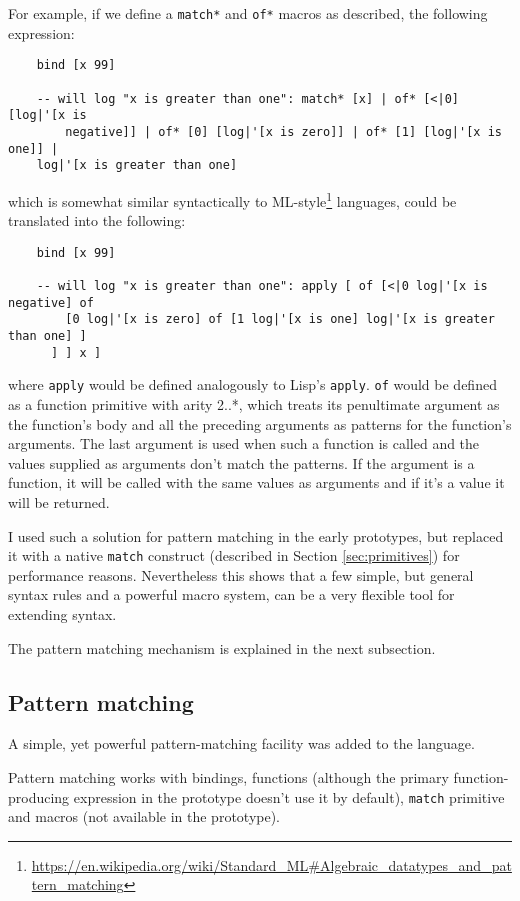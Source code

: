 For example, if we define a \texttt{match*} and \texttt{of*} macros as
described, the following expression:
\begin{lstlisting}
    bind [x 99]
    
    -- will log "x is greater than one": match* [x] | of* [<|0] [log|'[x is
        negative]] | of* [0] [log|'[x is zero]] | of* [1] [log|'[x is one]] |
    log|'[x is greater than one]
\end{lstlisting}

which is somewhat similar syntactically to
ML-style\footnote{\url{https://en.wikipedia.org/wiki/Standard_ML\#Algebraic_datatypes_and_pattern_matching}}
languages, could be translated into the following:
\begin{lstlisting}
    bind [x 99]
    
    -- will log "x is greater than one": apply [ of [<|0 log|'[x is negative] of
        [0 log|'[x is zero] of [1 log|'[x is one] log|'[x is greater than one] ]
      ] ] x ]
\end{lstlisting}

where \texttt{apply} would be defined analogously to Lisp's
\texttt{apply}. \texttt{of} would be defined as a function primitive with arity
2..*, which treats its penultimate argument as the function's body and all the
preceding arguments as patterns for the function's arguments. The last argument
is used when such a function is called and the values supplied as arguments
don't match the patterns. If the argument is a function, it will be called with
the same values as arguments and if it's a value it will be returned.

I used such a solution for pattern matching in the early prototypes, but
replaced it with a native \texttt{match} construct (described in Section
\ref{sec:primitives}) for performance reasons. Nevertheless this shows that a
few simple, but general syntax rules and a powerful macro system, can be a very
flexible tool for extending syntax.

The pattern matching mechanism is explained in the next subsection.

\subsection{Pattern matching}
A simple, yet powerful pattern-matching facility was added to the language.

Pattern matching works with bindings, functions (although the primary
function-producing expression in the prototype doesn't use it by default),
\texttt{match} primitive and macros (not available in the prototype).

